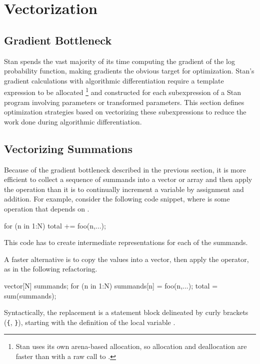 \section{Vectorization}

\subsection{Gradient Bottleneck}

Stan spends the vast majority of its time computing the gradient of
the log probability function, making gradients the obvious target for
optimization.  Stan's gradient calculations with algorithmic
differentiation require a template expression to be allocated%
%
\footnote{Stan uses its own arena-based allocation, so allocation and
  deallocation are faster than with a raw call to .}
%
and constructed for each subexpression of a Stan program involving
parameters or transformed parameters.  This section defines
optimization strategies based on vectorizing these subexpressions to
reduce the work done during algorithmic differentiation.

\subsection{Vectorizing Summations}

Because of the gradient bottleneck described in the previous section,
it is more efficient to collect a sequence of summands into a vector
or array and then apply the  operation than it is to
continually increment a variable by assignment and addition.  For
example, consider the following code snippet, where  is
some operation that depends on .
%
\begin{stancode}
for (n in 1:N)
  total += foo(n,...);
\end{stancode}
%
This code has to create intermediate representations for each
of the  summands.

A faster alternative is to copy the values into a vector, then
apply the  operator, as in the following refactoring.
%
\begin{stancode}
{
  vector[N] summands;
  for (n in 1:N)
    summands[n] = foo(n,...);
  total = sum(summands);
}
\end{stancode}
%
Syntactically, the replacement is a statement block delineated
by curly brackets (\Verb|{|, \Verb|}|), starting with the definition
of the local variable .


